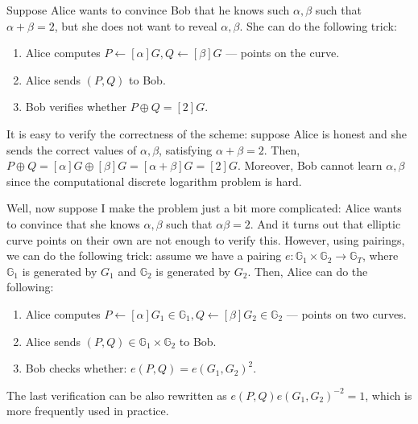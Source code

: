 \documentclass[../lecture-notes.tex]{subfiles}
\begin{document}
\begin{example}
    Suppose Alice wants to convince Bob that he knows such $\alpha,\beta$ such that $\alpha + \beta = 2$, but she does not want to reveal $\alpha,\beta$. She can do the following trick:
    \begin{enumerate}
        \item Alice computes $P \gets [\alpha]G, Q \gets [\beta]G$ --- points on the curve.
        \item Alice sends $(P,Q)$ to Bob.
        \item Bob verifies whether $P\oplus Q = [2]G$.
    \end{enumerate}
    
    It is easy to verify the correctness of the scheme: suppose Alice is honest and she sends the correct values of $\alpha,\beta$, satisfying $\alpha+\beta=2$. Then, $P\oplus Q = [\alpha]G \oplus [\beta]G = [\alpha+\beta]G = [2]G$. Moreover, Bob cannot learn $\alpha,\beta$ since the computational discrete logarithm problem is hard.        
\end{example}

\begin{example}
    Well, now suppose I make the problem just a bit more complicated: Alice wants to convince that she knows $\alpha,\beta$ such that $\alpha\beta=2$. And it turns out that elliptic curve points on their own are not enough to verify this. However, using pairings, we can do the following trick: assume we have a pairing $e: \mathbb{G}_1 \times \mathbb{G}_2 \to \mathbb{G}_T$, where $\mathbb{G}_1$ is generated by $G_1$ and $\mathbb{G}_2$ is generated by $G_2$. Then, Alice can do the following:
    \begin{enumerate}
        \item Alice computes $P \gets [\alpha]G_1 \in \mathbb{G}_1, Q \gets [\beta]G_2 \in \mathbb{G}_2$ --- points on two curves.
        \item Alice sends $(P,Q) \in \mathbb{G}_1 \times \mathbb{G}_2$ to Bob.
        \item Bob checks whether: $e(P,Q) = e(G_1,G_2)^{2}$.
    \end{enumerate}
\end{example}
\begin{remark}
    The last verification can be also rewritten as $e(P,Q)e(G_1,G_2)^{-2}=1$, which is more frequently used in practice.
\end{remark}
\end{document}
